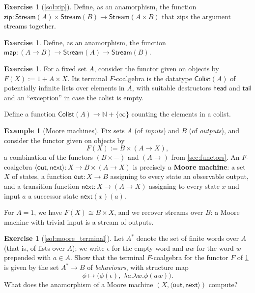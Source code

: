 \documentclass[a4paper,11pt, oneside,titlepage=false]{scrbook}
\theoremstyle{plain}
\theoremstyle{definition}
\newtheorem{exa}[thm]{Example}
\newtheorem{exer}[thm]{Exercise}
\newcommand{\Colist}{\ensuremath{\mathsf{Colist}}}
\newcommand{\Stream}{\ensuremath{\mathsf{Stream}}}
\newcommand{\tail}{\ensuremath{\mathsf{tail}}}
\newcommand{\head}{\ensuremath{\mathsf{head}}}
\newcommand{\zip}{\ensuremath{\mathsf{zip}}}
\newcommand{\map}{\ensuremath{\mathsf{map}}}
\begin{document}
\begin{exer}[\cref{sol:zip}]\label{exer:zip}
  Define, as an anamorphism, the function $\zip : \Stream(A) \times \Stream(B) \to \Stream(A \times B)$ that zips the argument streams together.
\end{exer}

\begin{exer}
  Define, as an anamorphism, the function $\map : (A \to B) \to \Stream(A) \to \Stream(B)$.
\end{exer}

\begin{exer}
  For a fixed set $A$, consider the functor given on objects by $F(X) := 1 + A \times X$.
  Its terminal $F$-coalgebra is the datatype $\Colist(A)$ of potentially infinite lists over elements in $A$, with suitable destructors $\head$ and $\tail$ and an ``exception'' in case the colist is empty.

  Define a function $\Colist(A) \to  \mathbb{N} + \{\infty\}$ counting the elements in a colist.
\end{exer}

\begin{exa}[Moore machines]\label{exa:moore}
  Fix sets $A$ (of \emph{inputs}) and $B$ (of \emph{outputs}), and consider the
  functor given on objects by
  \[
  F(X) := B \times (A \to X),
  \]
  a combination of the functors $(B \times -)$ and $(A \to)$ from
  \cref{sec:functors}.
  An $F$-coalgebra $\langle \mathsf{out}, \mathsf{next}\rangle : X \to B \times (A \to X)$
  is precisely a \textbf{Moore machine}: a set $X$ of states, a function
  $\mathsf{out} : X \to B$ assigning to every state an observable output, and a
  transition function $\mathsf{next} : X \to (A \to X)$ assigning to every
  state $x$ and input $a$ a successor state $\mathsf{next}(x)(a)$.

  For $A = 1$, we have $F(X) \cong B \times X$, and we recover streams over
  $B$: a Moore machine with trivial input is a stream of outputs.
\end{exa}

\begin{exer}[\cref{sol:moore_terminal}]\label{exer:moore_terminal}
  Let $A^{*}$ denote the set of finite words over $A$ (that is, of lists over
  $A$); we write $\epsilon$ for the empty word and $aw$ for the word $w$
  prepended with $a \in A$.
  Show that the terminal $F$-coalgebra for the functor $F$ of \cref{exa:moore}
  is given by the set $A^{*} \to B$ of \emph{behaviours}, with structure map
  \[
  \phi \mapsto \big(\phi(\epsilon),\; \lambda a. \lambda w. \phi(aw)\big).
  \]
  What does the anamorphism of a Moore machine
  $(X, \langle \mathsf{out}, \mathsf{next}\rangle)$ compute?
\end{exer}
\end{document}
